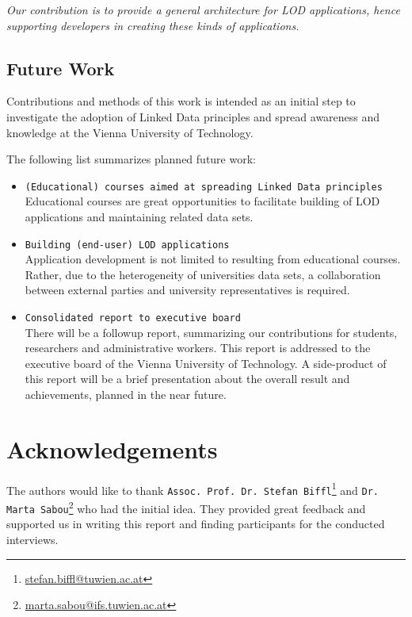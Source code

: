 \documentclass{article}
\begin{document}
\textit{Our contribution is to provide a general architecture for LOD applications, hence supporting developers in creating these kinds of applications.}

\subsection{Future Work}
\label{sec:future_work}
Contributions and methods of this work is intended as an initial step to investigate the adoption of Linked Data principles and spread awareness and knowledge at the Vienna University of Technology. 

The following list summarizes planned future work:
\begin{itemize}
	\item \texttt{(Educational) courses aimed at spreading Linked Data principles}~\\
	Educational courses are great opportunities to facilitate building of LOD applications and maintaining related data sets. 
	\item \texttt{Building (end-user) LOD applications}~\\
	Application development is not limited to resulting from educational courses. Rather, due to the heterogeneity of universities data sets, a collaboration between external parties and university representatives is required.  
	\item \texttt{Consolidated report to executive board}~\\
	There will be a followup report, summarizing our contributions for students, researchers and administrative workers. This report is addressed to the executive board of the Vienna University of Technology. A side-product of this report will be a brief presentation about the overall result and achievements, planned in the near future. 
\end{itemize}

\section{Acknowledgements}
The authors would like to thank \texttt{Assoc. Prof. Dr. Stefan Biffl}\footnote{\href{mailto:stefan.biffl@tuwien.ac.at}{stefan.biffl@tuwien.ac.at}} and \texttt{Dr. Marta Sabou}\footnote{\href{marta.sabou@ifs.tuwien.ac.at}{marta.sabou@ifs.tuwien.ac.at}} who had the initial idea. They provided great feedback and supported us in writing this report and finding participants for the conducted interviews. 
\end{document}
